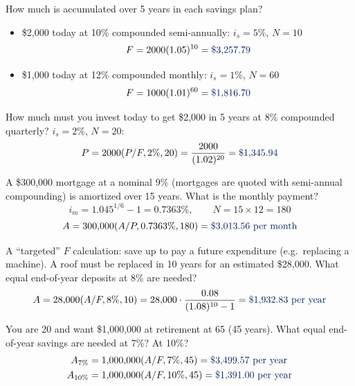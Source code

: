 \begin{example}
    How much is accumulated over 5 years in each savings plan?
    \begin{itemize}
        \item \$2,000 today at 10\% compounded semi-annually: $i_s = 5\%$, $N = 10$
        \[F = 2000(1.05)^{10} = \db{\$3{,}257.79}\]
        \item \$1,000 today at 12\% compounded monthly: $i_s = 1\%$, $N = 60$
        \[F = 1000(1.01)^{60} = \db{\$1{,}816.70}\]
    \end{itemize}
    How much must you invest today to get \$2,000 in 5 years at 8\% compounded quarterly? $i_s = 2\%$, $N = 20$:
    \[P = 2000(P/F,2\%,20) = \frac{2000}{(1.02)^{20}} = \db{\$1{,}345.94}\]
\end{example}

\begin{example}
    A \$300,000 mortgage at a nominal 9\% (mortgages are quoted with
    semi-annual compounding) is amortized over 15 years. What is the monthly payment?
    \\
    \[i_m = 1.045^{1/6} - 1 = 0.7363\%, \qquad N = 15 \times 12 = 180\]
    \[A = 300{,}000(A/P,0.7363\%,180) = \db{\$3{,}013.56 \text{ per month}}\]
\end{example}

\begin{example}
    A ``targeted'' $F$ calculation: save up to pay a future expenditure
    (e.g.\ replacing a machine). A roof must be replaced in 10 years for
    an estimated \$28,000. What equal end-of-year deposits at 8\% are needed?
    \[A = 28{,}000(A/F,8\%,10) = 28{,}000\cdot\frac{0.08}{(1.08)^{10}-1} = \db{\$1{,}932.83 \text{ per year}}\]
\end{example}

\begin{example}
    You are 20 and want \$1,000,000 at retirement at 65 (45 years). What
    equal end-of-year savings are needed at 7\%? At 10\%?
    \begin{align*}
        A_{7\%} &= 1{,}000{,}000(A/F,7\%,45) = \db{\$3{,}499.57 \text{ per year}}\\
        A_{10\%} &= 1{,}000{,}000(A/F,10\%,45) = \db{\$1{,}391.00 \text{ per year}}
    \end{align*}
\end{example}

